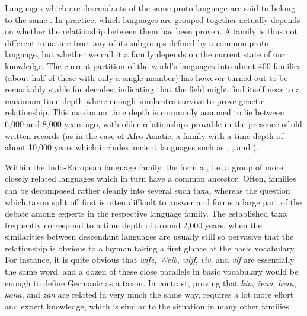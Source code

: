 Languages which are descendants of the same proto-language are said to belong to the same \textit{}. In practice, which languages are grouped together actually depends on whether the relationship between them has been proven. A family is thus not different in nature from any of its subgroups defined by a common proto-language, but whether we call it a family depends on the current state of our knowledge. The current partition of the world's languages into about 400 families (about half of these with only a single member) has however turned out to be remarkably stable for decades, indicating that the field might find itself near to a maximum time depth where enough similarites survive to prove genetic relationship. This maximum time depth is commonly assumed to lie between 6,000 and 8,000 years ago, with older relationships provable in the presence of old written records (as in the case of Afro-Asiatic, a family with a time depth of about 10,000 years which includes ancient languages such as , , and ).

Within the Indo-European language family, the  form a \textit{}, i.e. a group of more closely related languages which in turn have a common ancestor. Often, families can be decomposed rather cleanly into several such taxa, whereas the question which taxon split off first is often difficult to answer and forms a large part of the debate among experts in the respective language family. The established taxa frequently correspond to a time depth of around 2,000 years, when the similarities between descendant languages are usually still so pervasive that the relationship is obvious to a layman taking a first glance at the basic vocabulary. For instance, it is quite obvious that  \textit{wife},  \textit{Weib},  \textit{wijf},  \textit{viv}, and  \textit{víf} are essentially the same word, and a dozen of these close parallels in basic vocabulary would be enough to define Germanic as a taxon. In contrast, proving that  \textit{kin},  \textit{žena},  \textit{bean},  \textit{kona}, and  \textit{zan} are related in very much the same way, requires a lot more effort and expert knowledge, which is similar to the situation in many other families.


